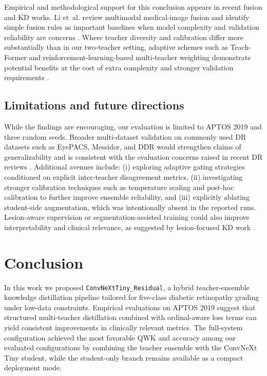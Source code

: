 \documentclass[a4paper,fleqn]{cas-dc}
\begin{document}
Empirical and methodological support for this conclusion appears in recent fusion and KD works. Li et~al. review multimodal medical-image fusion and identify simple fusion rules as important baselines when model complexity and validation reliability are concerns \cite{li2024}. Where teacher diversity and calibration differ more substantially than in our two-teacher setting, adaptive schemes such as Teach-Former and reinforcement-learning-based multi-teacher weighting demonstrate potential benefits at the cost of extra complexity and stronger validation requirements \cite{hossain2025,yang2025}.

\subsection{Limitations and future directions}

While the findings are encouraging, our evaluation is limited to APTOS 2019 and three random seeds. Broader multi-dataset validation on commonly used DR datasets such as EyePACS, Messidor, and DDR would strengthen claims of generalizability and is consistent with the evaluation concerns raised in recent DR reviews \cite{zhu2024,bappi2025}. Additional avenues include: (i) exploring adaptive gating strategies conditioned on explicit inter-teacher disagreement metrics, (ii) investigating stronger calibration techniques such as temperature scaling and post-hoc calibration to further improve ensemble reliability, and (iii) explicitly ablating student-side augmentation, which was intentionally absent in the reported runs. Lesion-aware supervision or segmentation-assisted training could also improve interpretability and clinical relevance, as suggested by lesion-focused KD work \cite{wang2024}.

\section{Conclusion}
\label{sec:conclusion}

In this work we proposed \texttt{ConvNeXtTiny\_Residual}, a hybrid teacher-ensemble knowledge distillation pipeline tailored for five-class diabetic retinopathy grading under low-data constraints. Empirical evaluations on APTOS 2019 suggest that structured multi-teacher distillation combined with ordinal-aware loss terms can yield consistent improvements in clinically relevant metrics. The full-system configuration achieved the most favorable QWK and accuracy among our evaluated configurations by combining the teacher ensemble with the ConvNeXt Tiny student, while the student-only branch remains available as a compact deployment mode.
\end{document}
